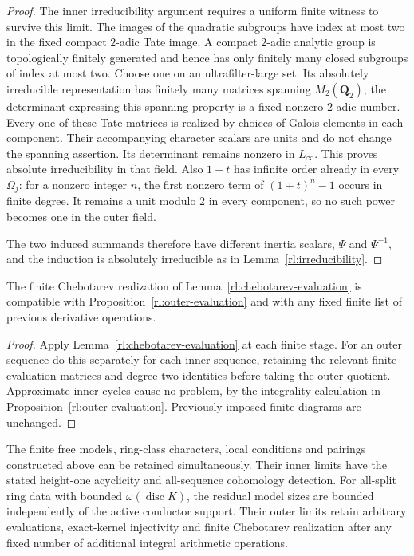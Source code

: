 \begin{proof}
The inner irreducibility argument requires a uniform finite
witness to survive this limit.  The images of the quadratic subgroups have index at most
two in the fixed compact $2$-adic Tate image.  A compact $2$-adic
analytic group is topologically finitely generated and hence has
only finitely many closed subgroups of index at most two.  Choose
one on an ultrafilter-large set.  Its absolutely irreducible
representation has finitely many matrices spanning
$M_2(\mathbf Q_2)$; the determinant expressing this spanning
property is a fixed nonzero $2$-adic number.  Every one of these
Tate matrices is realized by choices of Galois elements in each
component.  Their accompanying character scalars are units and
do not change the spanning assertion.  Its determinant remains
nonzero in $L_\infty$.  This proves absolute irreducibility in
that field.  Also $1+t$ has infinite order already in every
$\Omega_j$: for a nonzero integer $n$, the first nonzero term of
$(1+t)^n-1$ occurs in finite degree.  It remains a unit modulo
$2$ in every component, so no such power becomes one in the
outer field.

The two induced summands therefore have different inertia scalars,
$\Psi$ and $\Psi^{-1}$, and the induction is absolutely irreducible
as in Lemma~\ref{rl:irreducibility}.
\end{proof}

\begin{lemma}
\label{rl:outer-chebotarev}
The finite Chebotarev realization of Lemma~\ref{rl:chebotarev-evaluation}
is compatible with Proposition~\ref{rl:outer-evaluation} and with any
fixed finite list of previous derivative operations.
\end{lemma}

\begin{proof}
Apply Lemma~\ref{rl:chebotarev-evaluation} at each finite stage.
For an outer sequence do this separately
for each inner sequence, retaining the relevant finite evaluation
matrices and degree-two identities before taking the outer
quotient.  Approximate inner cycles cause no problem, by the
integrality calculation in Proposition~\ref{rl:outer-evaluation}.
Previously imposed finite diagrams are unchanged.
\end{proof}

\begin{theorem}
\label{rl:limit-evaluation-package}
The finite free models, ring-class characters, local conditions and
pairings constructed above can be retained simultaneously. Their
inner limits have the stated height-one acyclicity and all-sequence
cohomology detection. For all-split ring data with bounded
$\omega(\operatorname{disc}K)$, the residual model sizes are bounded
independently of the active conductor support. Their outer limits
retain arbitrary evaluations, exact-kernel injectivity and finite
Chebotarev realization after any fixed number of additional
integral arithmetic operations.
\end{theorem}

